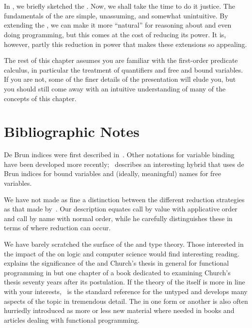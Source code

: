 \label{functional:theory}

\section{\LambdaCalc}
In , we briefly sketched the \lambdacalc{}. Now, we shall take the time to do it justice. The fundamentals of the \lambdacalc are simple, unassuming, and somewhat unintuitive. By extending the \lambdacalc{}, we can make it more ``natural'' for reasoning about and even doing programming, but this comes at the cost of reducing its power. It is, however, partly this reduction in power that makes these extensions so appealing.

The rest of this chapter assumes you are familiar with the first-order predicate calculus, in particular the treatment of quantifiers and free and bound variables. If you are not, some of the finer details of the presentation will elude you, but you should still come away with an intuitive understanding of many of the concepts of this chapter.




\section{Bibliographic Notes}
De Bru\ij n indices were first described in~\citet{Bruijn:Lambda:1972}. Other notations for variable binding have been developed more recently; \citet{McBride:Functional:2004}~describes an interesting hybrid that uses de Bru\ij n indices for bound variables and (ideally, meaningful) names for free variables.

We have not made as fine a distinction between the different reduction strategies as that made by~\citet{Sestoft:Demonstrating:2002}. Our description equates call by value with applicative order and call by name with normal order, while he carefully distinguishes these in terms of where reduction can occur.

We have barely scratched the surface of the \lambdacalc and type theory. Those interested in the impact of the \lambdacalc on logic and computer science would find \citet{Barendregt:The-impact:1997} interesting reading.  explains the significance of the \lambdacalc and Church's thesis in general for functional programming in but one chapter of a book \citep{Olszewski:Churchs:2006} dedicated to examining Church's thesis seventy years after its postulation. If the theory of the \lambdacalc itself is more in line with your interests, ~is the standard reference for the untyped \lambdacalc and develops many aspects of the topic in tremendous detail. The \lambdacalc in one form or another is also often hurriedly introduced as more or less new material where needed in books and articles dealing with functional programming.


